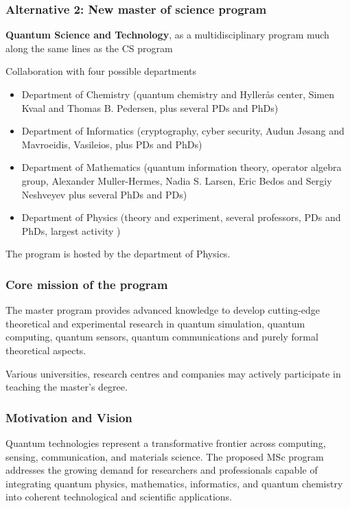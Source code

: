 \documentclass{beamer}
\begin{document}
\begin{frame}
\frametitle{Alternative 2: New master of science program}

\textbf{Quantum Science and Technology}, as a multidisciplinary program much along the same lines as the CS program
\begin{block}{Collaboration with four possible departments  }
\begin{itemize}
 \item Department of Chemistry (quantum chemistry and Hyllerås center, Simen Kvaal and Thomas B. Pedersen, plus several PDs and PhDs)

 \item Department of Informatics (cryptography, cyber security, Audun Jøsang and Mavroeidis, Vasileios, plus PDs and PhDs)

 \item Department of Mathematics (quantum information theory, operator algebra group, Alexander Muller-Hermes, Nadia S. Larsen, Eric Bedos and Sergiy Neshveyev plus several PhDs and PDs)

 \item Department of Physics (theory and experiment, several professors, PDs and PhDs, largest activity )
\end{itemize}

\noindent
\end{block}
The program is hosted by the department of Physics.
\end{frame}

\begin{frame}
\frametitle{Core mission of the program}

The master program provides advanced knowledge to develop
cutting-edge theoretical and experimental research in quantum
simulation, quantum computing, quantum sensors, quantum communications
and purely formal theoretical aspects.

Various universities, research centres and companies may actively
participate in teaching the master's degree.
\end{frame}


\begin{frame}

\frametitle{Motivation and Vision}

Quantum technologies represent a transformative frontier across
computing, sensing, communication, and materials science. The proposed
MSc program addresses the growing demand for researchers and
professionals capable of integrating quantum physics, mathematics,
informatics, and quantum chemistry into coherent technological and
scientific applications.
\end{frame}
\end{document}
